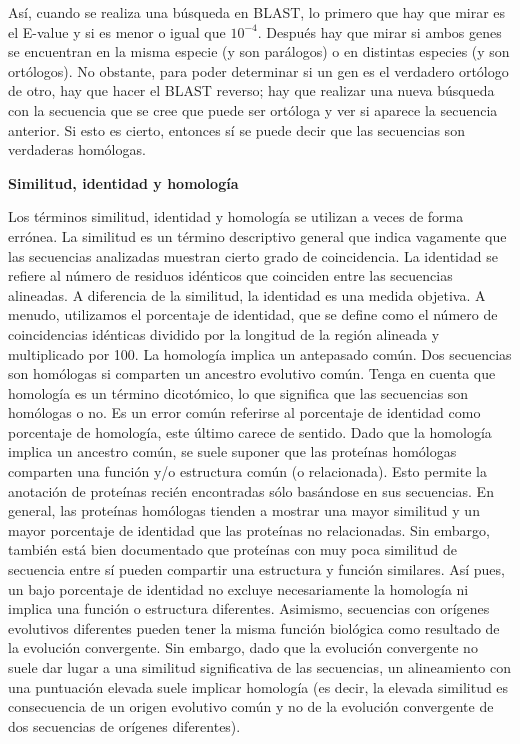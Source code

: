 Así, cuando se realiza una búsqueda en BLAST, lo primero que hay que mirar es el E-value y si es menor o igual que $10^{-4}$. Después hay que mirar si ambos genes se encuentran en la misma especie (y son parálogos) o en distintas especies (y son ortólogos). No obstante, para poder determinar si un gen es el verdadero ortólogo de otro, hay que hacer el BLAST reverso; hay que realizar una nueva búsqueda con la secuencia que se cree que puede ser ortóloga y ver si aparece la secuencia anterior. Si esto es cierto, entonces sí se puede decir que las secuencias son verdaderas homólogas.

\begin{table}[htbp]
\begin{mdframed}[backgroundcolor=black!10]
\textbf{Similitud, identidad y homología}

Los términos similitud, identidad y homología se utilizan a veces de forma errónea. La similitud es un término descriptivo general que indica vagamente que las secuencias analizadas muestran cierto grado de coincidencia. La identidad se refiere al número de residuos idénticos que coinciden entre las secuencias alineadas. A diferencia de la similitud, la identidad es una medida objetiva. A menudo, utilizamos el porcentaje de identidad, que se define como el número de coincidencias idénticas dividido por la longitud de la región alineada y multiplicado por 100. La homología implica un antepasado común. Dos secuencias son homólogas si comparten un ancestro evolutivo común. Tenga en cuenta que homología es un término dicotómico, lo que significa que las secuencias son homólogas o no. Es un error común referirse al porcentaje de identidad como porcentaje de homología, este último carece de sentido. Dado que la homología implica un ancestro común, se suele suponer que las proteínas homólogas comparten una función y/o estructura común (o relacionada). Esto permite la anotación de proteínas recién encontradas sólo basándose en sus secuencias. En general, las proteínas homólogas tienden a mostrar una mayor similitud y un mayor porcentaje de identidad que las proteínas no relacionadas. Sin embargo, también está bien documentado que proteínas con muy poca similitud de secuencia entre sí pueden compartir una estructura y función similares. Así pues, un bajo porcentaje de identidad no excluye necesariamente la homología ni implica una función o estructura diferentes. Asimismo, secuencias con orígenes evolutivos diferentes pueden tener la misma función biológica como resultado de la evolución convergente. Sin embargo, dado que la evolución convergente no suele dar lugar a una similitud significativa de las secuencias, un alineamiento con una puntuación elevada suele implicar homología (es decir, la elevada similitud es consecuencia de un origen evolutivo común y no de la evolución convergente de dos secuencias de orígenes diferentes).
\end{mdframed}
\end{table}

